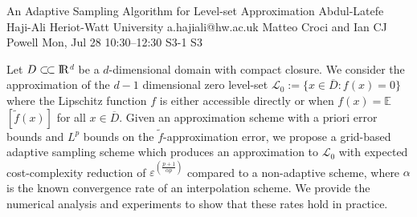 \begin{talk}
  {An Adaptive Sampling Algorithm for Level-set Approximation}%
  {Abdul-Latefe Haji-Ali}%
  {Heriot-Watt University}%
  {a.hajiali@hw.ac.uk}%
  {Matteo Croci and Ian CJ Powell}%
  {}%
  {Mon, Jul 28 10:30–12:30}%
  {S3-1}%
  {S3}%
  {}%
				

  Let $D\subset\joinrel\subset\rm{I\!R}$$^d$ be a $d$-dimensional domain with compact
closure. We consider the approximation of the $d-1$ dimensional zero level-set
$\mathcal{L}_0 := \{x \in \overline{D} : f(x) = 0\}$ where the Lipschitz function $f$ is either
accessible directly or when $f(x) = \mathbb{E}$$\left[\tilde{f}(x)\right]$ for
all $x \in \overline{D}$. Given an approximation scheme with a priori error bounds
and $L^p$ bounds on the $\tilde{f}$-approximation error, we propose a
grid-based adaptive sampling scheme which produces an approximation to $\mathcal{L}_0$
with expected cost-complexity reduction of $\varepsilon^{\left(\frac{p+1}{\alpha p}\right)}$
compared to a non-adaptive scheme, where $\alpha$ is the known convergence rate of
an interpolation scheme. We provide the numerical analysis and experiments to
show that these rates hold in practice.

\medskip


\end{talk}

